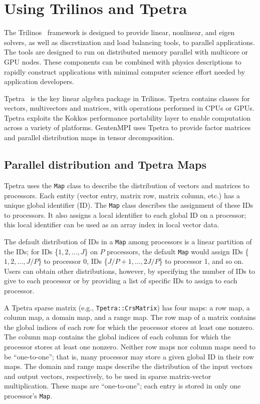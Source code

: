 
\chapter{Using Trilinos and Tpetra} \label{sec:trilinos}

The Trilinos~\cite{HB+05} framework is designed to provide linear, nonlinear, and eigen
solvers, as well as discretization and load balancing tools, to parallel
applications.  The tools are designed to run on distributed memory
parallel with multicore or GPU nodes.  
These components can be combined with physics descriptions to 
rapidly construct applications with minimal computer science effort needed
by application developers.

Tpetra~\cite{BH12} is the key linear algebra package in Trilinos.  
Tpetra contains classes
for vectors, multivectors and matrices, with operations performed in CPUs or
GPUs.  Tpetra exploits the Kokkos performance portability layer to enable
computation across a variety of platforms.  GentenMPI uses Tpetra to provide
factor matrices and parallel distribution maps in tensor decomposition.

\section{Parallel distribution and Tpetra Maps} \label{sec:maps}

Tpetra uses the {\tt Map} class to describe the distribution of vectors and
matrices to processors.  Each entity (vector entry, matrix row, matrix column,
etc.) has a unique global identifier (ID).  The {\tt Map} class describes 
the assignment of these IDs to processors.  It also assigns a local identifier
to each global ID on a processor; this local identifier can be used as an 
array index in local vector data.

The default distribution of IDs in a {\tt Map} among processors is 
a linear partition of the IDs; for IDs \{$1,2,\ldots, J$\} on $P$ 
processors, the default {\tt Map} would assign IDs \{$1,2,\ldots,J/P$\} to 
processor 0, IDs \{$J/P+1,\ldots,2J/P$\} to processor 1, and so on.  Users can
obtain other distributions, however, by specifying the number of IDs
to give to each processor or by providing a list of specific IDs to assign
to each processor.

A Tpetra sparse matrix (e.g., {\tt Tpetra::CrsMatrix}) 
has four maps:  a row map, a column map, a domain map, and a range map.  
The row map
of a matrix contains the global indices of each row for which the processor
stores at least one nonzero.  The column map contains the global indices of
each column for which the processor stores at least one nonzero.  Neither
row maps nor column maps need to be ``one-to-one''; that is, many processor
may store a given global ID in their row maps.  The domain and range maps
describe the distribution of the input vectors and output vectors, respectively,
to be used in sparse matrix-vector multiplication.  These maps are 
``one-to-one''; each entry is stored in only one processor's {\tt Map}.

